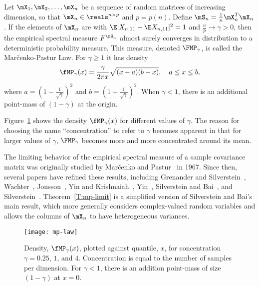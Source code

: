 \begin{theorem}\label{T:mp-limit}
Let $\mX_1, \mX_2, \ldots, \mX_n$ be a sequence of random matrices of increasing dimension, so that $\mX_n \in \reals^{n\times p}$ and $p = p(n)$.
Define $\mS_n = \frac{1}{n} \mX_n^T \mX_n$.  If the elements of $\mX_n$ are \iid with $\E| X_{n,11} - \E X_{n,11} |^2 = 1$ and $\frac{n}{p} \to \gamma > 0$, then the empirical spectral measure $F^{\mS_n}$ almost surely converges in distribution to a deterministic probability measure.  This measure, denoted
$\FMP_\gamma$, is called the Mar\v{c}enko-Pastur Law.  For $\gamma \geq 1$ it
has density
\begin{equation}
    \fMP_\gamma(x)
    =
    \frac{\gamma}{2 \pi x}
    \sqrt{(x - a)(b - x)},
    \quad
    a \leq x \leq b,
\end{equation}
where
\(
    a = \left( 1 - \frac{1}{\sqrt{\gamma}} \right)^2
\)
and
\(
    b = \left( 1 + \frac{1}{\sqrt{\gamma}} \right)^2.
\)
When $\gamma < 1$, there is an additional point-mass of $(1 - \gamma)$ at the origin.
\end{theorem}

\noindent
Figure~\ref{F:mp-law} shows the density $\fMP_\gamma(x)$ for different values
of $\gamma$.  The reason for choosing the name ``concentration'' to refer to $\gamma$ becomes apparent in that for larger values of $\gamma$, $\FMP_\gamma$ becomes more and more concentrated around its mean.

The limiting behavior of the empirical spectral measure of a sample covariance matrix was originally studied by Mar\v{c}enko and Pastur~\cite{marcenko1967des} in 1967.  Since then, several papers have refined these results, including Grenander and Silverstein~\cite{grenander1977san}, Wachter~\cite{wachter1978slr},
 Jonsson~\cite{jonsson1982slt}, Yin and Krishnaiah~\cite{yin1983lte},
Yin~\cite{yin1986lsd}, Silverstein and Bai~\cite{silverstein1995ede}, and
Silverstein~\cite{silverstein1995sce}.  Theorem~\ref{T:mp-limit} is a simplified version of Silverstein and Bai's main result, which more generally considers complex-valued random variables and allows the columns of $\mX_n$ to have heterogeneous variances.

\begin{figure}[ht]
    \centering
    \texttt{[image: mp-law]}
    \caption{
        Density, $\fMP_\gamma(x)$, plotted against quantile, $x$,
        for concentration $\gamma = 0.25$, $1$, and $4$.  Concentration
        is equal to the number of samples per dimension. For $\gamma < 1$,
        there is an addition point-mass of size $(1 - \gamma)$ at $x = 0$.
    }\label{F:mp-law}
\end{figure}

